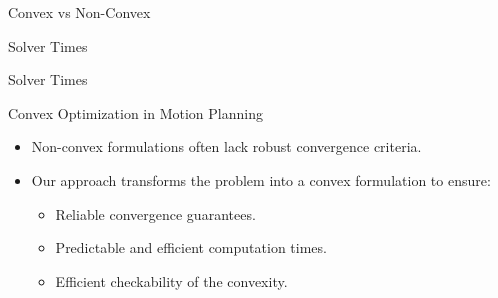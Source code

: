 \documentclass[shortpres,aspectratio=43]{beamer}
\begin{document}
\begin{frame}{Convex vs Non-Convex}
\end{frame}

\begin{frame}{Solver Times}
\end{frame}

\begin{frame}{Solver Times}
\end{frame}

\begin{frame}{Convex Optimization in Motion Planning}
  \begin{itemize}
    \item Non-convex formulations often lack robust convergence criteria.
    \item Our approach transforms the problem into a convex formulation to ensure:
          \begin{itemize}
            \item Reliable convergence guarantees.
            \item Predictable and efficient computation times.
            \item Efficient checkability of the convexity.
          \end{itemize}
  \end{itemize}
\end{frame}
\end{document}
